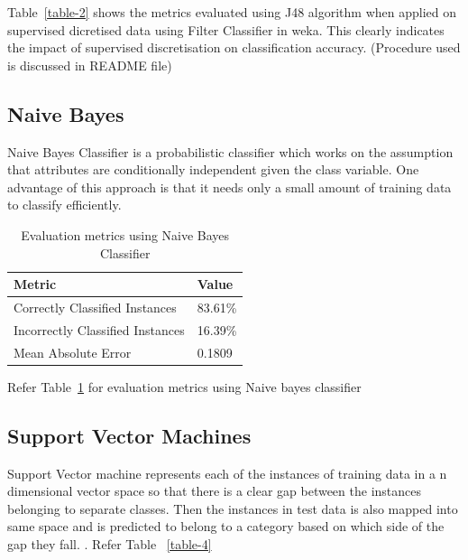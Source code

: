 \documentclass[11pt]{article}
\begin{document}
Table~\ref{table-2} shows the metrics evaluated using J48 algorithm when applied on supervised dicretised data using Filter Classifier in weka. This clearly indicates the impact of supervised discretisation on classification accuracy. (Procedure used is discussed in README file)

\subsection{Naive Bayes}
Naive Bayes Classifier is a probabilistic classifier which works on the assumption that attributes are conditionally independent given the class variable. One advantage of this approach is that it needs only a small amount of training data to classify efficiently. 

\begin{table}[h]
 \begin{center}
\begin{tabular}{|l|l|}

	\hline
     Metric & Value  \\
     \hline\hline
     Correctly Classified Instances & 83.61\% \\
	 Incorrectly Classified Instances & 16.39\% \\
	 Mean Absolute Error& 0.1809 \\
     \hline
     
 \end{tabular}
\caption{Evaluation metrics using Naive Bayes Classifier}\label{table-3}
 \end{center}
\end{table}

Refer Table~\ref{table-3} for evaluation metrics using Naive bayes classifier

\subsection{Support Vector Machines}
Support Vector machine represents each of the instances of training data in a n dimensional vector space so that there is a clear gap between the instances belonging to separate classes. Then the instances in test data is also mapped into same space and is predicted to belong to a category based on which side of the gap they fall. . Refer Table ~\ref{table-4}
\end{document}
